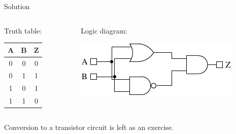 \begin{frame}{Solution}
  \begin{columns}
    \begin{column}{4cm}
      Truth table:\\
      \begin{center}
        \begin{tabular}{cc|c}
          \textbf{A} & \textbf{B} & \textbf{Z} \\
          \hline
          0 & 0 & 0 \\
          0 & 1 & 1 \\
          1 & 0 & 1 \\
          1 & 1 & 0 \\
        \end{tabular}
      \end{center}
    \end{column}
    \begin{column}{6cm}
      Logic diagram:\\
      \begin{center}
        \includegraphics{XORLogicCircuit}
      \end{center}
    \end{column}
  \end{columns}
  \medskip
  Conversion to a transistor circuit is left as an exercise.
\end{frame}

